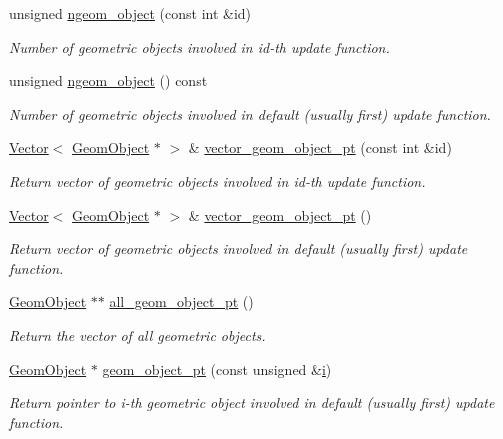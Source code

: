 \begin{DoxyCompactItemize}
unsigned \hyperlink{classoomph_1_1AlgebraicNode_a0e1fa66d3543da39a5e728d8af5c1734}{ngeom\+\_\+object} (const int \&id)
\begin{DoxyCompactList}\small\item\em Number of geometric objects involved in id-\/th update function. \end{DoxyCompactList}\item 
unsigned \hyperlink{classoomph_1_1AlgebraicNode_a10f49849e0942e68c6791810ffc6fb31}{ngeom\+\_\+object} () const
\begin{DoxyCompactList}\small\item\em Number of geometric objects involved in default (usually first) update function. \end{DoxyCompactList}\item 
\hyperlink{classoomph_1_1Vector}{Vector}$<$ \hyperlink{classoomph_1_1GeomObject}{Geom\+Object} $\ast$ $>$ \& \hyperlink{classoomph_1_1AlgebraicNode_aa82f9b47f4b7fb1cc49178c48c2873d3}{vector\+\_\+geom\+\_\+object\+\_\+pt} (const int \&id)
\begin{DoxyCompactList}\small\item\em Return vector of geometric objects involved in id-\/th update function. \end{DoxyCompactList}\item 
\hyperlink{classoomph_1_1Vector}{Vector}$<$ \hyperlink{classoomph_1_1GeomObject}{Geom\+Object} $\ast$ $>$ \& \hyperlink{classoomph_1_1AlgebraicNode_aa242d4039f28e65c407bf90033489a75}{vector\+\_\+geom\+\_\+object\+\_\+pt} ()
\begin{DoxyCompactList}\small\item\em Return vector of geometric objects involved in default (usually first) update function. \end{DoxyCompactList}\item 
\hyperlink{classoomph_1_1GeomObject}{Geom\+Object} $\ast$$\ast$ \hyperlink{classoomph_1_1AlgebraicNode_aac2c907cb2258892583d38e8c3e52326}{all\+\_\+geom\+\_\+object\+\_\+pt} ()
\begin{DoxyCompactList}\small\item\em Return the vector of all geometric objects. \end{DoxyCompactList}\item 
\hyperlink{classoomph_1_1GeomObject}{Geom\+Object} $\ast$ \hyperlink{classoomph_1_1AlgebraicNode_a6ea1dc01f3b657b5c63d6de2b67ea990}{geom\+\_\+object\+\_\+pt} (const unsigned \&\hyperlink{cfortran_8h_adb50e893b86b3e55e751a42eab3cba82}{i})
\begin{DoxyCompactList}\small\item\em Return pointer to i-\/th geometric object involved in default (usually first) update function. \end{DoxyCompactList}\item 
$$
\end{DoxyCompactItemize}
